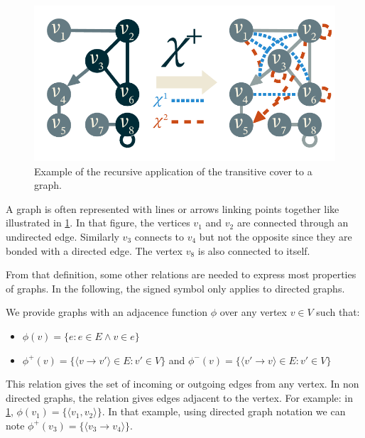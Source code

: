 \documentclass[11pt,a4paper,twoside,openright,titlepage,numbers=noenddot,headinclude,cleardoublepage=empty,openany]{scrreprt}
\theoremstyle{plain}
\theoremstyle{definition}
\theoremstyle{remark}
\providecommand{\tightlist}{%
  \setlength{\itemsep}{0pt}\setlength{\parskip}{0pt}}
\begin{document}
\begin{figure}
\hypertarget{fig:transitive}{%
\centering
\includegraphics{./tex2pdf.-0b80fea6fd6da7f9/c790717c908f42ebc6617793bbc16752d05d85db.pdf}
\caption{Example of the recursive application of the transitive cover to
a graph.}\label{fig:transitive}
}
\end{figure}

A graph is often represented with lines or arrows linking points
together like illustrated in \cref{fig:transitive}. In that figure, the
vertices \(v_1\) and \(v_2\) are connected through an undirected edge.
Similarly \(v_3\) connects to \(v_4\) but not the opposite since they
are bonded with a directed edge. The vertex \(v_8\) is also connected to
itself.

From that definition, some other relations are needed to express most
properties of graphs. In the following, the signed symbol only applies
to directed graphs.

We provide graphs with an adjacence function \(\phi\) over any vertex
\(v \in V\) such that:

\begin{itemize}
\tightlist
\item
  \(\phi(v) = \{ e : e\in E \land v \in e \}\)
\item
  \(\phi^+(v) = \{ \langle v \rightarrow v' \rangle \in E : v' \in V \}\)
  and
  \(\phi^-(v) = \{ \langle v' \rightarrow v \rangle \in E : v' \in V \}\)
\end{itemize}

This relation gives the set of incoming or outgoing edges from any
vertex. In non directed graphs, the relation gives edges adjacent to the
vertex. For example: in \cref{fig:transitive},
\(\phi(v_1) = \{ \langle v_1, v_2 \rangle \}\). In that example, using
directed graph notation we can note
\(\phi^+(v_3) = \{ \langle v_3 \rightarrow v_4 \rangle \}\).
\end{document}
